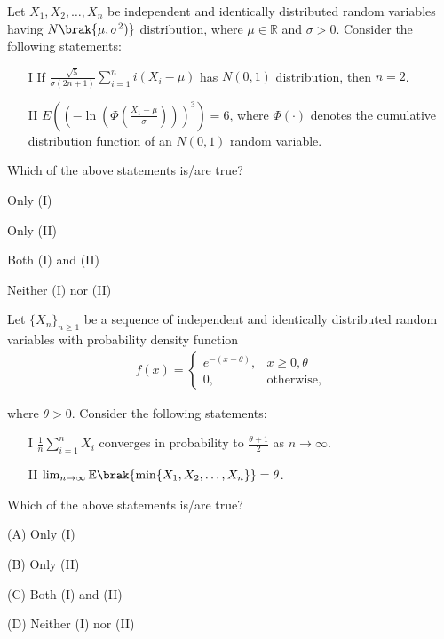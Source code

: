 \item Let $X_1, X_2, \dots, X_n$ be independent and identically distributed random variables having $N\brak{\mu, \sigma^2)}$ distribution, where $\mu \in \mathbb{R}$ and $\sigma > 0$. Consider the following statements:
\begin{enumerate}
\item[I] If $\frac{\sqrt{5}}{\sigma(2n + 1)} \sum_{i = 1}^{n} i (X_{i} - \mu )$ has $N(0, 1)$ distribution, then $n = 2$.
\item[II] $E\left(\left(-\ln\left(\Phi \left(\frac{X_{1} - \mu }{\sigma}\right)\right)\right)^{3}\right) = 6$, where $\Phi(\cdot)$ denotes the cumulative distribution function of an $N(0, 1)$ random variable.
\end{enumerate}

Which of the above statements is/are true?

\begin{enumerate}
\begin{multicols}{4}
\item Only (I)
\item Only (II)
\item Both (I) and (II)
\item Neither (I) nor (II)
\end{multicols}
\end{enumerate}


\item Let $\{X_n\}_{n \geq 1}$ be a sequence of independent and identically distributed random variables with probability density function
\begin{align}
f(x) = \begin{cases}
e^{-(x - \theta)}, & x \geq 0,\theta \ \\
0, & \text{otherwise},
\end{cases}
\end{align}

where $\theta > 0$. Consider the following statements:
\begin{enumerate}
\item[I] $\frac{1}{n} \sum_{i=1}^n X_i$ converges in probability to $\frac{\theta + 1}{2}$ as $n \to \infty$.

\item[II] $\lim_{n \to \infty} \mathbb{E}\brak{\min\{X_1, X_2, \dots, X_n\}} = \theta $.
\end{enumerate}
Which of the above statements is/are true?

\begin{enumerate}
\begin{multicols}{4}
    \item[(A)] Only (I)
    \item[(B)] Only (II)
    \item[(C)] Both (I) and (II)
    \item[(D)] Neither (I) nor (II)
    \end{multicols}
\end{enumerate}

